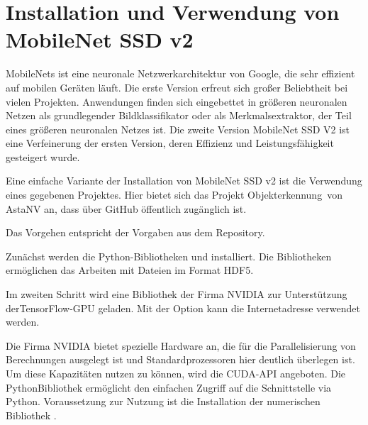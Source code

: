 \section{Installation und Verwendung von MobileNet SSD v2} %

MobileNets ist eine neuronale Netzwerkarchitektur von Google, die sehr effizient auf mobilen Geräten läuft. Die erste Version erfreut sich großer Beliebtheit bei vielen
Projekten. Anwendungen finden sich eingebettet in größeren neuronalen Netzen  als grundlegender Bildklassifikator oder als Merkmalsextraktor, der Teil eines größeren neuronalen Netzes ist. Die zweite Version MobileNet SSD V2 ist eine Verfeinerung 
der ersten Version, deren Effizienz und Leistungsfähigkeit gesteigert wurde. \cite{MobileNet:2018}

\bigskip

Eine einfache Variante der Installation von MobileNet SSD v2 ist die Verwendung eines gegebenen
Projektes. Hier bietet sich das Projekt \glqq Objekterkennung\grqq\, von AstaNV an, dass über GitHub öffentlich zugänglich ist. \cite{AstaNV:2020,GitHub:2020}


Das Vorgehen entspricht der Vorgaben aus dem Repository.

\medskip


Zunächst werden die Python-Bibliotheken  und 
installiert. Die Bibliotheken ermöglichen das Arbeiten mit Dateien im Format \glqq HDF5\grqq.

\medskip


\medskip

Im zweiten Schritt wird eine Bibliothek der Firma NVIDIA zur Unterstützung derTensorFlow-GPU geladen. Mit der
Option  kann die Internetadresse verwendet werden.

\medskip



\medskip


Die Firma NVIDIA bietet spezielle Hardware an, die für die Parallelisierung von Berechnungen ausgelegt ist
und Standardprozessoren hier deutlich überlegen ist. Um diese Kapazitäten nutzen zu können, wird die
CUDA-API angeboten. Die PythonBibliothek  ermöglicht den einfachen Zugriff auf die Schnittstelle
via Python. Voraussetzung zur Nutzung ist die Installation der numerischen Bibliothek .

